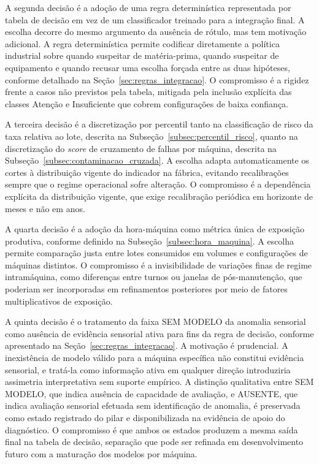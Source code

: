 A segunda decisão é a adoção de uma regra determinística representada por tabela de decisão em vez de um classificador treinado para a integração final. A escolha decorre do mesmo argumento da ausência de rótulo, mas tem motivação adicional. A regra determinística permite codificar diretamente a política industrial sobre quando suspeitar de matéria-prima, quando suspeitar de equipamento e quando recusar uma escolha forçada entre as duas hipóteses, conforme detalhado na Seção~\ref{sec:regras_integracao}. O compromisso é a rigidez frente a casos não previstos pela tabela, mitigada pela inclusão explícita das classes Atenção e Insuficiente que cobrem configurações de baixa confiança.

A terceira decisão é a discretização por percentil tanto na classificação de risco da taxa relativa ao lote, descrita na Subseção~\ref{subsec:percentil_risco}, quanto na discretização do \emph{score} de cruzamento de falhas por máquina, descrita na Subseção~\ref{subsec:contaminacao_cruzada}. A escolha adapta automaticamente os cortes à distribuição vigente do indicador na fábrica, evitando recalibrações sempre que o regime operacional sofre alteração. O compromisso é a dependência explícita da distribuição vigente, que exige recalibração periódica em horizonte de meses e não em anos.

A quarta decisão é a adoção da hora-máquina como métrica única de exposição produtiva, conforme definido na Subseção~\ref{subsec:hora_maquina}. A escolha permite comparação justa entre lotes consumidos em volumes e configurações de máquinas distintos. O compromisso é a invisibilidade de variações finas de regime intramáquina, como diferenças entre turnos ou janelas de pós-manutenção, que poderiam ser incorporadas em refinamentos posteriores por meio de fatores multiplicativos de exposição.

A quinta decisão é o tratamento da faixa SEM MODELO da anomalia sensorial como ausência de evidência sensorial ativa para fins da regra de decisão, conforme apresentado na Seção~\ref{sec:regras_integracao}. A motivação é prudencial. A inexistência de modelo válido para a máquina específica não constitui evidência sensorial, e tratá-la como informação ativa em qualquer direção introduziria assimetria interpretativa sem suporte empírico. A distinção qualitativa entre SEM MODELO, que indica ausência de capacidade de avaliação, e AUSENTE, que indica avaliação sensorial efetuada sem identificação de anomalia, é preservada como estado registrado do pilar e disponibilizada na evidência de apoio do diagnóstico. O compromisso é que ambos os estados produzem a mesma saída final na tabela de decisão, separação que pode ser refinada em desenvolvimento futuro com a maturação dos modelos por máquina.

